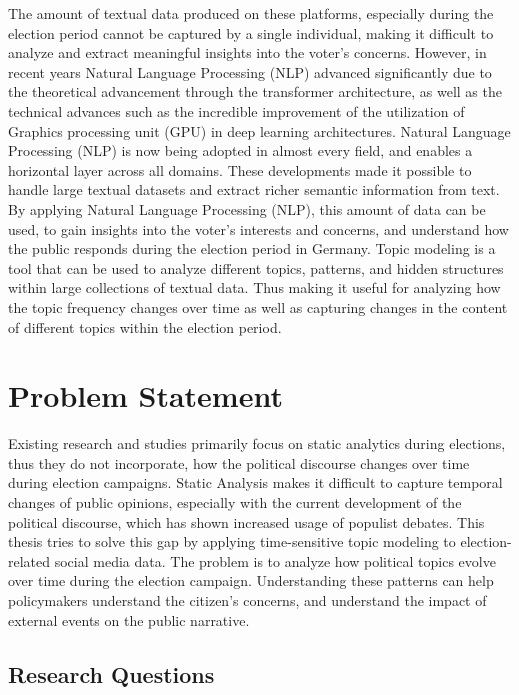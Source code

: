 The amount of textual data produced on these platforms, especially during the election period cannot be captured by a single individual, making it difficult to analyze and extract meaningful insights into the voter's concerns.
However, in recent years Natural Language Processing (NLP) advanced significantly due to the theoretical advancement through the transformer architecture, as well as the technical advances such as the incredible improvement of the utilization of Graphics processing unit (GPU) in deep learning architectures.
Natural Language Processing (NLP) is now being adopted in almost every field, and enables a horizontal layer across all domains.
These developments made it possible to handle large textual datasets and extract richer semantic information from text.
By applying Natural Language Processing (NLP), this amount of data can be used, to gain insights into the voter's interests and concerns, and understand how the public responds during the election period in Germany. Topic modeling is a tool that can be used to analyze different topics, patterns, and hidden structures within large collections of textual data. Thus making it useful for analyzing how the topic frequency changes over time as well as capturing changes in the content of different topics within the election period.

\section{Problem Statement}\label{ch:1-problem}

Existing research and studies primarily focus on static analytics during elections, thus they do not incorporate, how the political discourse changes over time during election campaigns. Static Analysis makes it difficult to capture temporal changes of public opinions, especially with the current development of the political discourse, which has shown increased usage of populist debates.
This thesis tries to solve this gap by applying time-sensitive topic modeling to election-related social media data. The problem is to analyze how political topics evolve over time during the election campaign. Understanding these patterns can help policymakers understand the citizen's concerns, and understand the impact of external events on the public narrative.


\subsection{Research Questions}

